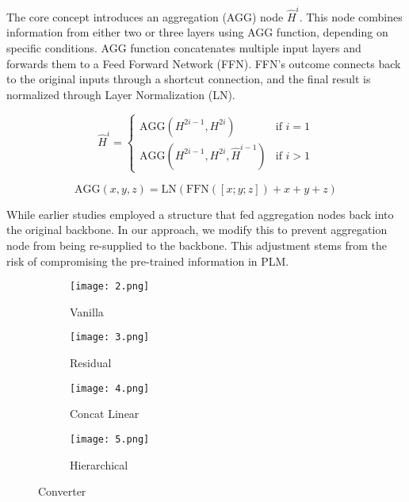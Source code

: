 \documentclass[conference]{IEEEtran}
\begin{document}
The core concept introduces an aggregation (AGG) node $\hat{H}^i$. This node combines information from either two or three layers using AGG function, depending on specific conditions. AGG function concatenates multiple input layers and forwards them to a Feed Forward Network (FFN). FFN's outcome connects back to the original inputs through a shortcut connection, and the final result is normalized through Layer Normalization (LN).

\begin{equation}
\hat{H}^i = \begin{cases}
\text{AGG}(H^{2i-1}, H^{2i}) & \text{if } i = 1 \\
\text{AGG}(H^{2i-1}, H^{2i}, \hat{H}^{i-1}) & \text{if } i > 1
\end{cases}
\end{equation}

\begin{equation}
\text{AGG}(x, y, z) = \text{LN}(\text{FFN}([x;y;z]) + x + y + z)
\end{equation}


While earlier studies \cite{dou2018exploiting} employed a structure that fed aggregation nodes back into the original backbone. In our approach, we modify this to prevent aggregation node from being re-supplied to the backbone. This adjustment stems from the risk of compromising the pre-trained information in PLM.


\begin{figure}[!tb]
    \centering
    \begin{subfigure}{.25\textwidth}
        \centering
        \texttt{[image: 2.png]}
        \caption{Vanilla}
        \label{fig:a}
    \end{subfigure}\begin{subfigure}{.25\textwidth}
        \centering
        \texttt{[image: 3.png]}
        \caption{Residual}
    \end{subfigure}
    
    \vspace{1em} 

    \begin{subfigure}{.25\textwidth}
        \centering
        \texttt{[image: 4.png]}
        \caption{Concat Linear}
    \end{subfigure}\begin{subfigure}{.25\textwidth}
        \centering
        \texttt{[image: 5.png]}
        \caption{Hierarchical}
    \end{subfigure}
    \caption{Converter}
\end{figure}
\end{document}
